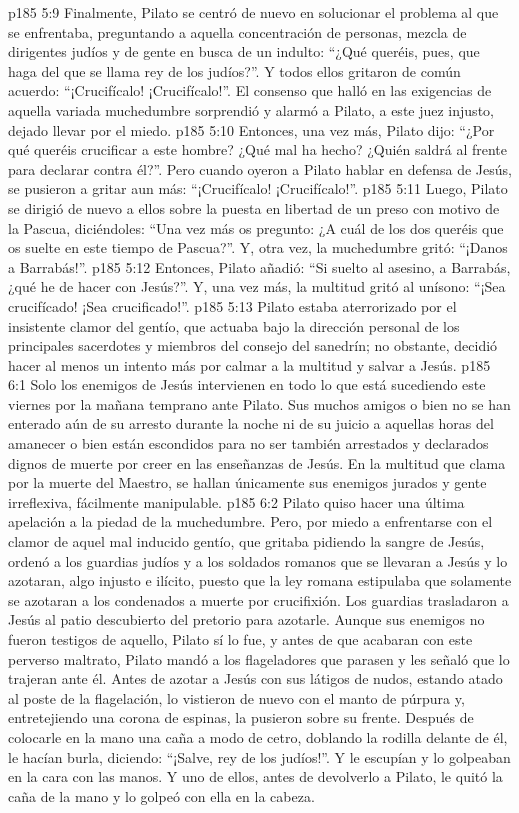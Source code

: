 \vs p185 5:9 Finalmente, Pilato se centró de nuevo en solucionar el problema al que se enfrentaba, preguntando a aquella concentración de personas, mezcla de dirigentes judíos y de gente en busca de un indulto: “¿Qué queréis, pues, que haga del que se llama rey de los judíos?”. Y todos ellos gritaron de común acuerdo: “¡Crucifícalo! ¡Crucifícalo!”. El consenso que halló en las exigencias de aquella variada muchedumbre sorprendió y alarmó a Pilato, a este juez injusto, dejado llevar por el miedo.
\vs p185 5:10 Entonces, una vez más, Pilato dijo: “¿Por qué queréis crucificar a este hombre? ¿Qué mal ha hecho? ¿Quién saldrá al frente para declarar contra él?”. Pero cuando oyeron a Pilato hablar en defensa de Jesús, se pusieron a gritar aun más: “¡Crucifícalo! ¡Crucifícalo!”.
\vs p185 5:11 Luego, Pilato se dirigió de nuevo a ellos sobre la puesta en libertad de un preso con motivo de la Pascua, diciéndoles: “Una vez más os pregunto: ¿A cuál de los dos queréis que os suelte en este tiempo de Pascua?”. Y, otra vez, la muchedumbre gritó: “¡Danos a Barrabás!”.
\vs p185 5:12 Entonces, Pilato añadió: “Si suelto al asesino, a Barrabás, ¿qué he de hacer con Jesús?”. Y, una vez más, la multitud gritó al unísono: “¡Sea crucifícado! ¡Sea crucificado!”.
\vs p185 5:13 Pilato estaba aterrorizado por el insistente clamor del gentío, que actuaba bajo la dirección personal de los principales sacerdotes y miembros del consejo del sanedrín; no obstante, decidió hacer al menos un intento más por calmar a la multitud y salvar a Jesús.
\vs p185 6:1 Solo los enemigos de Jesús intervienen en todo lo que está sucediendo este viernes por la mañana temprano ante Pilato. Sus muchos amigos o bien no se han enterado aún de su arresto durante la noche ni de su juicio a aquellas horas del amanecer o bien están escondidos para no ser también arrestados y declarados dignos de muerte por creer en las enseñanzas de Jesús. En la multitud que clama por la muerte del Maestro, se hallan únicamente sus enemigos jurados y gente irreflexiva, fácilmente manipulable.
\vs p185 6:2 Pilato quiso hacer una última apelación a la piedad de la muchedumbre. Pero, por miedo a enfrentarse con el clamor de aquel mal inducido gentío, que gritaba pidiendo la sangre de Jesús, ordenó a los guardias judíos y a los soldados romanos que se llevaran a Jesús y lo azotaran, algo injusto e ilícito, puesto que la ley romana estipulaba que solamente se azotaran a los condenados a muerte por crucifixión. Los guardias trasladaron a Jesús al patio descubierto del pretorio para azotarle. Aunque sus enemigos no fueron testigos de aquello, Pilato sí lo fue, y antes de que acabaran con este perverso maltrato, Pilato mandó a los flageladores que parasen y les señaló que lo trajeran ante él. Antes de azotar a Jesús con sus látigos de nudos, estando atado al poste de la flagelación, lo vistieron de nuevo con el manto de púrpura y, entretejiendo una corona de espinas, la pusieron sobre su frente. Después de colocarle en la mano una caña a modo de cetro, doblando la rodilla delante de él, le hacían burla, diciendo: “¡Salve, rey de los judíos!”. Y le escupían y lo golpeaban en la cara con las manos. Y uno de ellos, antes de devolverlo a Pilato, le quitó la caña de la mano y lo golpeó con ella en la cabeza.

